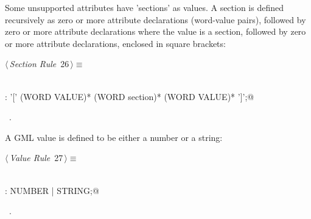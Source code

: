 \documentclass[a4paper]{report}
\begin{document}
Some unsupported attributes have 'sections' as values. A section is defined recursively as zero or more attribute declarations (word-value pairs), followed by zero or more attribute declarations where the value is a section, followed by zero or more attribute declarations, enclosed in square brackets:
\begin{flushleft} \small
\begin{minipage}{\linewidth}\label{scrap26}\raggedright\small
{} $\langle\,${\itshape Section Rule}\nobreak\ {\footnotesize {26}}$\,\rangle\equiv$
\vspace{-1ex}
\begin{list}{}{} \item
\mbox{}\verb@@\\
\mbox{}\verb@section: '[' (WORD VALUE)*  (WORD section)* (WORD VALUE)* ']';@\\
\mbox{}\verb@@{\NWsep}
\end{list}
\vspace{-1.5ex}
\footnotesize
\begin{list}{}{\setlength{\itemsep}{-\parsep}\setlength{\itemindent}{-\leftmargin}}
\item \NWtxtMacroRefIn\ .

\item{}
\end{list}
\end{minipage}\vspace{4ex}
\end{flushleft}
A GML value is defined to be either a number or a string:
\begin{flushleft} \small
\begin{minipage}{\linewidth}\label{scrap27}\raggedright\small
{} $\langle\,${\itshape Value Rule}\nobreak\ {\footnotesize {27}}$\,\rangle\equiv$
\vspace{-1ex}
\begin{list}{}{} \item
\mbox{}\verb@@\\
\mbox{}\verb@VALUE: NUMBER | STRING;@\\
\mbox{}\verb@@{\NWsep}
\end{list}
\vspace{-1.5ex}
\footnotesize
\begin{list}{}{\setlength{\itemsep}{-\parsep}\setlength{\itemindent}{-\leftmargin}}
\item \NWtxtMacroRefIn\ .

\item{}
\end{list}
\end{minipage}\vspace{4ex}
\end{flushleft}
\end{document}
